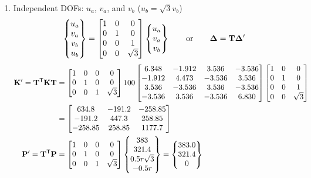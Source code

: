 \begin{example}
{\begin{enumerate}[label=(\arabic*),leftmargin=*]
    \begin{equation*}
      \bmat{634.8 & -191.2 & -149.45\\ -191.2 & 447.3 & 149.45\\ -149.45 & 149.45 & 392.56}\Bmat{u_a\\ v_a\\ u_b} = \Bmat{383\\ 321.4\\ 0},\quad\text{Solution is: }\Bmat{.92828\\ 1.1426\\ -.08159}
    \end{equation*}
    From the constraint equation, $v_b = u_b/\sqrt3 = -.08159/\sqrt3 = -4.7106\times10^{-2}$.
  \item Independent DOFs: $u_a$, $v_a$, and $v_b$ ($u_b = \sqrt3v_b$)
    \begin{equation*}
      \begin{Bmatrix}u_a\\ v_a\\ v_b\\ u_b\end{Bmatrix} = \begin{bmatrix}1 & 0 & 0\\ 0 & 1 & 0\\ 0 & 0 & 1\\ 0 & 0 & \sqrt3\end{bmatrix}\begin{Bmatrix}u_a\\ v_a\\ v_b\end{Bmatrix}\qquad\text{or}\qquad \bm{\Delta} = \mathbf{T}\bm{\Delta}'
    \end{equation*}
    \begin{align*}
      \Kmat' = \Tmat^\tr\Kmat\Tmat &= \bmat{1 & 0 & 0 & 0\\ 0 & 1 & 0 & 0\\ 0 & 0 & 1 & \sqrt3}100\bmat{6.348 & -1.912 & 3.536 & -3.536\\ -1.912 & 4.473 & -3.536 & 3.536\\ 3.536 & -3.536 & 3.536 & -3.536\\ -3.536 & 3.536 & -3.536 & 6.830}\bmat{1 & 0 & 0\\ 0 & 1 & 0\\ 0 & 0 & 1\\ 0 & 0 & \sqrt3}\\
      &= \bmat{634.8 & -191.2 & -258.85\\ -191.2 & 447.3 & 258.85\\ -258.85 & 258.85 & 1177.7}\\
      \Pvec' = \Tmat^\tr\Pvec &= \bmat{1 & 0 & 0 & 0\\ 0 & 1 & 0 & 0\\ 0 & 0 & 1 & \sqrt3}\Bmat{383\\ 321.4\\ 0.5r\sqrt3\\ -0.5r} = \Bmat{383.0\\ 321.4\\ 0}

\end{align*}
\end{enumerate}}
\end{example}
